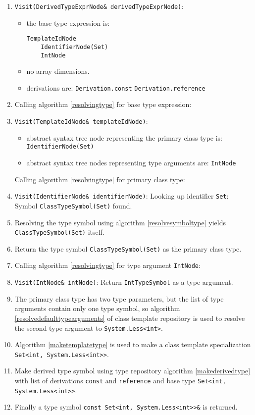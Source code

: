\documentclass[a4paper,oneside,11pt]{book}
\theoremstyle{definition}
\begin{document}
\begin{flushleft}
\begin{enumerate}
\item
\verb|Visit(DerivedTypeExprNode& derivedTypeExprNode)|:
\begin{itemize}
\item
the base type expression is:
\begin{verbatim}
TemplateIdNode
    IdentifierNode(Set)
    IntNode
\end{verbatim}
\item
no array dimensions.
\item
derivations are:
\verb|Derivation.const|
\verb|Derivation.reference|
\end{itemize}
\item
Calling algorithm \ref{resolvingtype} for base type expression:
\item
\verb|Visit(TemplateIdNode& templateIdNode)|:
\begin{itemize}
\item
abstract syntax tree node representing the primary class type is:
\verb|IdentifierNode(Set)|
\item
abstract syntax tree nodes representing type arguments are:
\verb|IntNode|
\end{itemize}
Calling algorithm \ref{resolvingtype} for primary class type:
\item
\verb|Visit(IdentifierNode& identifierNode)|:
Looking up identifier \verb|Set|:
Symbol \verb|ClassTypeSymbol(Set)| found.
\item
Resolving the type symbol using algorithm \ref{resolvesymboltype} yields \verb|ClassTypeSymbol(Set)| itself.
\item
Return the type symbol \verb|ClassTypeSymbol(Set)| as the primary class type.
\item
Calling algorithm \ref{resolvingtype} for type argument \verb|IntNode|:
\item
\verb|Visit(IntNode& intNode)|:
Return \verb|IntTypeSymbol| as a type argument.
\item
The primary class type has two type parameters, but the list of type arguments contain only one type symbol,
so algorithm \ref{resolvedefaulttypearguments} of class template repository is used to resolve the second type argument to \verb|System.Less<int>|.
\item
Algorithm \ref{maketemplatetype} is used to make a class template specialization \verb|Set<int, System.Less<int>>|.
\item
Make derived type symbol using type repository algorithm \ref{makederivedtype} with list of derivations \verb|const| and \verb|reference| and
base type \verb|Set<int, System.Less<int>>|.
\item
Finally a type symbol \verb|const Set<int, System.Less<int>>&| is returned.
\end{enumerate}
\end{flushleft}
\end{document}
